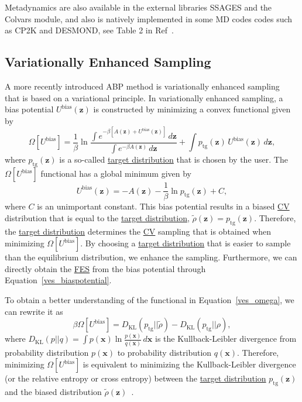\documentclass[9pt,review]{livecoms}
\newcommand{\vx}{\mathbf{x}}
\newcommand{\vz}{\mathbf{z}}
\begin{document}
Metadynamics are also available in the external libraries SSAGES and the Colvars module, and also is natively implemented in some MD codes codes such as CP2K and DESMOND, see Table 2 in Ref~\cite{BussiLaio_ReviewMetaD_2020}.

\subsection{Variationally Enhanced Sampling}
\label{sec:ves}
A more recently introduced ABP method is variationally enhanced
sampling~\cite{Valsson_VES_PRL_2014,Valsson2020Handbook_VES} that is based on a variational principle.
In variationally enhanced sampling, a bias potential $U^{\mathrm{bias}}(\vz)$ is constructed by minimizing a convex functional given by
\begin{equation}
\label{ves_omega}
\Omega [U^{\mathrm{bias}}] =
\frac{1}{\beta} \ln
\frac
{\int e^{-\beta \left[ A(\vz) + U^{\mathrm{bias}}(\vz)\right]} \, d\vz }
{\int e^{-\beta A(\vz)} \, d\vz}
+
\int p_{\mathrm{tg}}(\vz) \, U^{\mathrm{bias}}(\vz) \, d\vz,
\end{equation}
where $p_{\mathrm{tg}}(\vz)$ is a so-called \hyperlink{ref:targetdist}{target distribution} that is chosen by the user. The $\Omega [U^{\mathrm{bias}}]$ functional has a global minimum given by
\begin{equation}
\label{ves_biaspotential}
U^{\mathrm{bias}}(\vz) = -A(\vz)- \frac{1}{\beta} \ln {p_{\mathrm{tg}}(\vz)} + C,
\end{equation}
where $C$ is an unimportant constant. This bias potential results in a biased \hyperlink{ref:CV} {CV} distribution that is equal to the \hyperlink{ref:targetdist}{target distribution}, $\tilde{\rho}(\vz) = p_{\mathrm{tg}}(\vz)$. Therefore, the \hyperlink{ref:targetdist}{target distribution} determines the \hyperlink{ref:CV} {CV} sampling that is obtained when minimizing $\Omega [U^{\mathrm{bias}}]$. By choosing a \hyperlink{ref:targetdist}{target distribution} that is easier to sample than the equilibrium distribution, we enhance the sampling. Furthermore, we can directly obtain the \hyperlink{ref:FES} {FES} from the bias potential through Equation~\ref{ves_biaspotential}.

To obtain a better understanding of the functional in Equation~\ref{ves_omega}, we can rewrite it as~\cite{Valsson2020Handbook_VES,Invernizzi-PNAS-2017}
\begin{equation}
\beta \Omega [U^{\mathrm{bias}}] = D_{\mathrm{KL}}(p_{\mathrm{tg}}||\tilde{\rho})-D_{\mathrm{KL}}(p_{\mathrm{tg}}||\rho),
\end{equation}
where $D_{\mathrm{KL}}(p||q)=\int p(\vx) \ln\frac{p(\vx)}{q(\vx)} \, d\vx$ is the Kullback-Leibler divergence from probability distribution $p(\vx)$ to probability distribution $q(\vx)$. Therefore, minimizing $\Omega [U^{\mathrm{bias}}]$ is equivalent to minimizing the Kullback-Leibler divergence (or the relative entropy or cross entropy) between the \hyperlink{ref:targetdist}{target distribution} $p_{\mathrm{tg}}(\vz)$ and the biased distribution $\tilde{\rho}(\vz)$~\cite{Rubinstein-MetCompAppProb-1999,Shell-JCP-2008,Bilionis-JCompPhys-2012,Zhang_SIAM-JSC-2014}.
\end{document}
